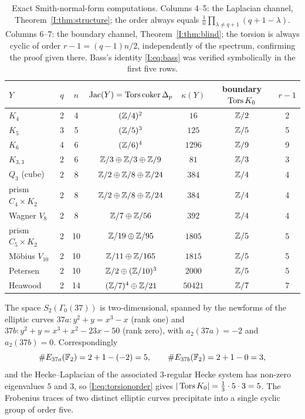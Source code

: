 \begin{table}[t]
\centering\small
\renewcommand{\arraystretch}{1.15}\setlength{\tabcolsep}{5pt}
\begin{tabular}{lccccc c}
\toprule
$Y$ & $q$ & $n$ & $\operatorname{Jac}(Y)=\operatorname{Tors}\operatorname{coker}\Delta_p$ & $\kappa(Y)$ & boundary $\operatorname{Tors} K_0$ & $r-1$\\
\midrule
$K_4$              &2& 4&$(\mathbb{Z}/4)^2$                   &$16$    &$\mathbb{Z}/2$&2\\
$K_5$              &3& 5&$(\mathbb{Z}/5)^3$                   &$125$   &$\mathbb{Z}/5$&5\\
$K_6$              &4& 6&$(\mathbb{Z}/6)^4$                   &$1296$  &$\mathbb{Z}/9$&9\\
$K_{3,3}$          &2& 6&$\mathbb{Z}/3\oplus\mathbb{Z}/3\oplus\mathbb{Z}/9$   &$81$    &$\mathbb{Z}/3$&3\\
$Q_3$ (cube)       &2& 8&$\mathbb{Z}/2\oplus\mathbb{Z}/8\oplus\mathbb{Z}/24$  &$384$   &$\mathbb{Z}/4$&4\\
prism $C_4\times K_2$&2& 8&$\mathbb{Z}/2\oplus\mathbb{Z}/8\oplus\mathbb{Z}/24$&$384$   &$\mathbb{Z}/4$&4\\
Wagner $V_8$       &2& 8&$\mathbb{Z}/7\oplus\mathbb{Z}/56$            &$392$   &$\mathbb{Z}/4$&4\\
prism $C_5\times K_2$&2&10&$\mathbb{Z}/19\oplus\mathbb{Z}/95$         &$1805$  &$\mathbb{Z}/5$&5\\
M\"obius $V_{10}$  &2&10&$\mathbb{Z}/11\oplus\mathbb{Z}/165$          &$1815$  &$\mathbb{Z}/5$&5\\
Petersen           &2&10&$\mathbb{Z}/2\oplus(\mathbb{Z}/10)^3$        &$2000$  &$\mathbb{Z}/5$&5\\
Heawood            &2&14&$(\mathbb{Z}/7)^4\oplus\mathbb{Z}/21$        &$50421$ &$\mathbb{Z}/7$&7\\
\bottomrule
\end{tabular}
\medskip
\caption{Exact Smith-normal-form computations. Columns 4--5: the Laplacian channel,
Theorem~\ref{I:thm:structure}; the order always equals
$\frac1n\prod_{\lambda\neq q+1}(q+1-\lambda)$. Columns 6--7: the boundary channel,
Theorem~\ref{I:thm:blind}; the torsion is always cyclic of order $r-1=(q-1)n/2$,
independently of the spectrum, confirming the proof given there. Bass's identity
\eqref{I:eq:bass} was verified symbolically in the first five rows.}
\label{I:tab:snf}
\end{table}

\begin{example}[Level $37$, $p=2$: two elliptic curves, one torsion group]\label{I:ex:37}
The space $S_2(\Gamma_0(37))$ is two-dimensional, spanned by the newforms of the
elliptic curves $37a: y^2+y=x^3-x$ (rank one) and $37b: y^2+y=x^3+x^2-23x-50$ (rank
zero), with $a_2(37a)=-2$ and $a_2(37b)=0$. Correspondingly
\[
\#E_{37a}(\mathbb{F}_2)=2+1-(-2)=5,\qquad \#E_{37b}(\mathbb{F}_2)=2+1-0=3,
\]
and the Hecke--Laplacian of the associated $3$-regular Hecke system has non-zero
eigenvalues $5$ and $3$, so \eqref{I:eq:torsionorder} gives
$|\operatorname{Tors} K_0|=\tfrac13\cdot5\cdot3=5$. The Frobenius traces of two distinct elliptic
curves precipitate into a single cyclic group of order five.
\end{example}

